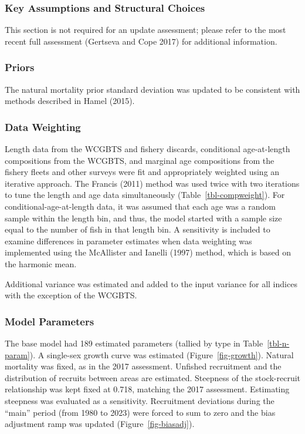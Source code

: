 \documentclass[
]{scrartcl}
\begin{document}
\subsubsection{Key Assumptions and Structural
Choices}\label{key-assumptions-and-structural-choices}

This section is not required for an update assessment; please refer to
the most recent full assessment (Gertseva and Cope 2017) for additional
information.

\subsubsection{Priors}\label{priors}

The natural mortality prior standard deviation was updated to be
consistent with methods described in Hamel (2015).

\subsubsection{Data Weighting}\label{data-weighting}

Length data from the WCGBTS and fishery discards, conditional
age-at-length compositions from the WCGBTS, and marginal age
compositions from the fishery fleets and other surveys were fit and
appropriately weighted using an iterative approach. The Francis (2011)
method was used twice with two iterations to tune the length and age
data simultaneously (Table~\ref{tbl-compweight}). For
conditional-age-at-length data, it was assumed that each age was a
random sample within the length bin, and thus, the model started with a
sample size equal to the number of fish in that length bin. A
sensitivity is included to examine differences in parameter estimates
when data weighting was implemented using the McAllister and Ianelli
(1997) method, which is based on the harmonic mean.

Additional variance was estimated and added to the input variance for
all indices with the exception of the WCGBTS.

\subsubsection{Model Parameters}\label{model-parameters}

The base model had 189 estimated parameters (tallied by type in
Table~\ref{tbl-n-param}). A single-sex growth curve was estimated
(Figure~\ref{fig-growth}). Natural mortality was fixed, as in the 2017
assessment. Unfished recruitment and the distribution of recruits
between areas are estimated. Steepness of the stock-recruit relationship
was kept fixed at 0.718, matching the 2017 assessment. Estimating
steepness was evaluated as a sensitivity. Recruitment deviations during
the ``main'' period (from 1980 to 2023) were forced to sum to zero and
the bias adjustment ramp was updated (Figure~\ref{fig-biasadj}).
\end{document}
